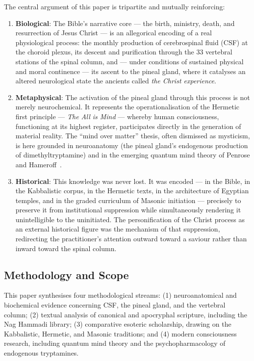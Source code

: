 \documentclass[12pt, a4paper]{article}
\begin{document}
The central argument of this paper is tripartite and mutually reinforcing:

\begin{enumerate}[label=\textbf{\arabic*.}]
  \item \textbf{Biological}: The Bible's narrative core — the birth, ministry,
  death, and resurrection of Jesus Christ — is an allegorical encoding of a
  real physiological process: the monthly production of cerebrospinal fluid
  (CSF) at the choroid plexus, its descent and purification through the 33
  vertebral stations of the spinal column, and — under conditions of
  sustained physical and moral continence — its ascent to the pineal gland,
  where it catalyses an altered neurological state the ancients called
  \emph{the Christ experience}.

  \item \textbf{Metaphysical}: The activation of the pineal gland through this
  process is not merely neurochemical. It represents the operationalisation of
  the Hermetic first principle — \emph{The All is Mind} — whereby human
  consciousness, functioning at its highest register, participates directly in
  the generation of material reality. The ``mind over matter'' thesis, often
  dismissed as mysticism, is here grounded in neuroanatomy (the pineal gland's
  endogenous production of dimethyltryptamine) and in the emerging quantum
  mind theory of Penrose and Hameroff~\autocite{hameroff2014}.

  \item \textbf{Historical}: This knowledge was never lost. It was encoded —
  in the Bible, in the Kabbalistic corpus, in the Hermetic texts, in the
  architecture of Egyptian temples, and in the graded curriculum of Masonic
  initiation — precisely to preserve it from institutional suppression while
  simultaneously rendering it unintelligible to the uninitiated. The
  personification of the Christ process as an external historical figure was
  the mechanism of that suppression, redirecting the practitioner's attention
  outward toward a saviour rather than inward toward the spinal column.
\end{enumerate}

\subsection{Methodology and Scope}

This paper synthesises four methodological streams: (1) neuroanatomical and
biochemical evidence concerning CSF, the pineal gland, and the vertebral
column; (2) textual analysis of canonical and apocryphal scripture, including
the Nag Hammadi library; (3) comparative esoteric scholarship, drawing on the
Kabbalistic, Hermetic, and Masonic traditions; and (4) modern consciousness
research, including quantum mind theory and the psychopharmacology of
endogenous tryptamines.
\end{document}
